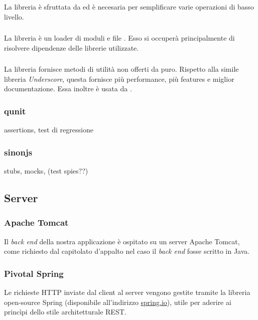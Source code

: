 \subsubsection{\jquery}
La libreria \jquery{} è sfruttata da \jointjs{} ed è necesaria per semplificare varie operazioni di basso livello.


\subsubsection{\requirejs}
La libreria \requirejs{} è un loader di moduli e file \js{}. Esso si occuperà principalmente di risolvere dipendenze delle librerie \js{} utilizzate.

\subsubsection{\lodash}
La libreria \lodash{} fornisce metodi di utilità non offerti da \js{} puro. Rispetto alla simile libreria \emph{Underscore}, questa fornisce più performance, più features e miglior documentazione. Essa inoltre è usata da \jointjs{}.


\subsubsection{qunit}
assertions, test di regressione
\subsubsection{sinonjs}
stubs, mocks, (test spies??)




\subsection{Server}


\subsubsection{Apache Tomcat}
Il \emph{back end} della nostra applicazione è ospitato su un server Apache Tomcat, come richiesto dal capitolato d'appalto nel caso il \emph{back end} fosse scritto in Java.

\subsubsection{Pivotal Spring}
Le richieste HTTP inviate dal client al server vengono gestite tramite la libreria open-source Spring (disponibile all'indirizzo \url{spring.io}), utile per aderire ai princìpi dello stile architetturale REST.

